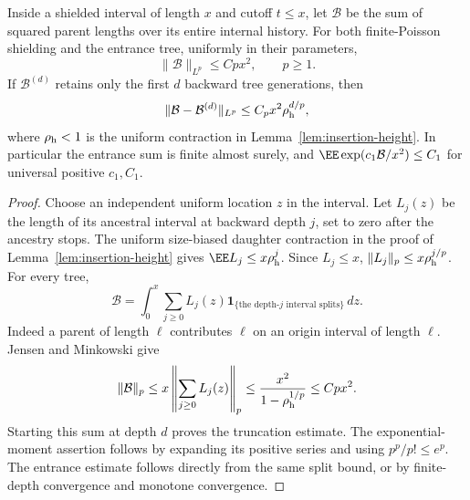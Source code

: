 \documentclass[11pt,letterpaper]{article}
\newcommand{\ind}{\mathbf 1}\newcommand{\Exp}{\operatorname{Exp}}
\begin{document}
\begin{lemma}
\label{lem:parent-square-tree-mark}
Inside a shielded interval of length $x$ and cutoff $t\le x$,
let $\mathcal B$ be the sum of squared parent lengths over its
entire internal history. For both finite-Poisson shielding and
the entrance tree, uniformly in their parameters,
\begin{equation}\label{eq:parent-square-tree-moments}
 \|\mathcal B\|_{L^p}\le Cp x^2,\qquad p\ge1.
\end{equation}
If $\mathcal B^{(d)}$ retains only the first $d$ backward tree
generations, then
\[
 \|\mathcal B-\mathcal B^{(d)}\|_{L^p}
             \le C_p x^2\rho_{\rm h}^{d/p},
\]
where $\rho_{\rm h}<1$ is the uniform contraction in
Lemma~\ref{lem:insertion-height}. In particular the entrance
sum is finite almost surely, and
$\EE\exp(c_1\mathcal B/x^2)\le C_1$ for universal positive
$c_1,C_1$.
\end{lemma}
\begin{proof}
Choose an independent uniform location $z$ in the interval.
Let $L_j(z)$ be the length of its ancestral interval at backward
depth $j$, set to zero after the ancestry stops. The uniform
size-biased daughter contraction in the proof of
Lemma~\ref{lem:insertion-height} gives
$\EE L_j\le x\rho_{\rm h}^j$. Since $L_j\le x$,
$\|L_j\|_p\le x\rho_{\rm h}^{j/p}$.
For every tree,
\[
 \mathcal B=\int_0^x\sum_{j\ge0}L_j(z)
                 \ind_{\{\text{the depth-$j$ interval splits}\}}\,dz.
\]
Indeed a parent of length $\ell$ contributes $\ell$ on an
origin interval of length $\ell$. Jensen and Minkowski give
\[
 \|\mathcal B\|_p
   \le x\left\|\sum_{j\ge0}L_j(z)\right\|_p
   \le\frac{x^2}{1-\rho_{\rm h}^{1/p}}\le Cp x^2.
\]
Starting this sum at depth $d$ proves the truncation estimate.
The exponential-moment assertion follows by expanding its
positive series and using $p^p/p!\le e^p$.
The entrance estimate follows directly from the same split
bound, or by finite-depth convergence and monotone convergence.
\end{proof}
\end{document}
